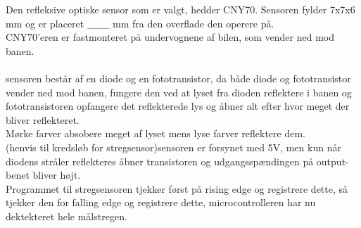 
Den refleksive optiske sensor som er valgt, hedder CNY70. Sensoren fylder 7x7x6 mm og er placeret ___ mm fra den overflade den operere på. \\
CNY70'eren er fastmonteret på undervognene af bilen, som vender ned mod banen.\\
\\

sensoren består af en diode og en fototransistor, da både diode og fototransistor vender ned mod banen, fungere den ved at lyset fra dioden reflektere i banen og fototransistoren opfangere det reflekterede lys og åbner alt efter hvor meget der bliver reflekteret. \\
Mørke farver absobere meget af lyset mens lyse farver reflektere dem. \\
(henvis til kredsløb for stregsensor)sensoren er forsynet med 5V, men kun når diodens stråler reflekteres åbner transistoren og udgangsspændingen på output-benet bliver højt.\\
Programmet til stregsensoren tjekker først på rising edge og registrere dette, så tjekker den for falling edge og registrere dette, microcontrolleren har nu dektekteret hele målstregen. \\

